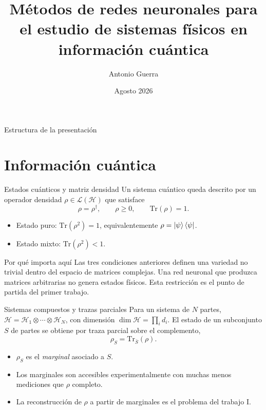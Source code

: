 \documentclass[10pt,aspectratio=169]{beamer}
\title[Redes neuronales en informacion cuantica]{Métodos de redes neuronales para el estudio de sistemas físicos en información cuántica}
\author[A. Guerra]{Antonio Guerra}
\institute[UdeC]{Departamento de Física, Universidad de Concepción \\ Instituto Milenio de Investigación en Óptica}
\date{Agosto 2026}
\newcommand{\Hil}{\mathcal{H}}
\newcommand{\Tr}{\mathrm{Tr}}
\newcommand{\dens}{\rho}
\begin{document}
\begin{frame}
  \titlepage
\end{frame}

\begin{frame}{Estructura de la presentación}
  \tableofcontents
\end{frame}

\section{Información cuántica}

\begin{frame}{Estados cuánticos y matriz densidad}
  Un sistema cuántico queda descrito por un operador densidad $\dens \in \mathcal{L}(\Hil)$ que satisface
  \[
    \dens = \dens^{\dagger}, \qquad \dens \geq 0, \qquad \Tr(\dens) = 1 .
  \]
  \pause
  \begin{itemize}
    \item Estado puro: $\Tr(\dens^2) = 1$, equivalentemente $\dens = \ket{\psi}\bra{\psi}$.
    \item Estado mixto: $\Tr(\dens^2) < 1$.
  \end{itemize}
  \pause
  \vfill
  \begin{block}{Por qué importa aquí}
    Las tres condiciones anteriores definen una variedad no trivial dentro del espacio de matrices complejas. Una red neuronal que produzca matrices arbitrarias no genera estados físicos. Esta restricción es el punto de partida del primer trabajo.
  \end{block}
\end{frame}

\begin{frame}{Sistemas compuestos y trazas parciales}
  Para un sistema de $N$ partes, $\Hil = \Hil_1 \otimes \cdots \otimes \Hil_N$, con dimensión $\dim \Hil = \prod_i d_i$.
  \pause
  \vfill
  El estado de un subconjunto $S$ de partes se obtiene por traza parcial sobre el complemento,
  \[
    \dens_S = \Tr_{\bar{S}}(\dens) .
  \]
  \pause
  \begin{itemize}
    \item $\dens_S$ es el \emph{marginal} asociado a $S$.
    \item Los marginales son accesibles experimentalmente con muchas menos mediciones que $\dens$ completo.
    \item La reconstrucción de $\dens$ a partir de marginales es el problema del trabajo I.
  \end{itemize}
\end{frame}
\end{document}
